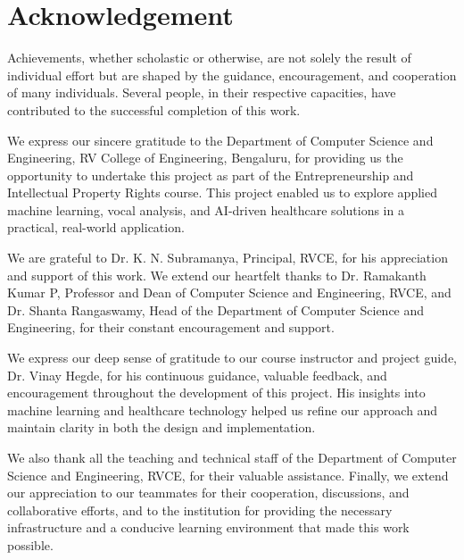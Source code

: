 
\newpage
\chapter*{Acknowledgement}

Achievements, whether scholastic or otherwise, are not solely the result of individual effort but are shaped by the guidance, encouragement, and cooperation of many individuals. Several people, in their respective capacities, have contributed to the successful completion of this work.

We express our sincere gratitude to the Department of Computer Science and Engineering, RV College of Engineering, Bengaluru, for providing us the opportunity to undertake this project as part of the Entrepreneurship and Intellectual Property Rights course. This project enabled us to explore applied machine learning, vocal analysis, and AI-driven healthcare solutions in a practical, real-world application.

We are grateful to Dr. K. N. Subramanya, Principal, RVCE, for his appreciation and support of this work. We extend our heartfelt thanks to Dr. Ramakanth Kumar P, Professor and Dean of Computer Science and Engineering, RVCE, and Dr. Shanta Rangaswamy, Head of the Department of Computer Science and Engineering, for their constant encouragement and support.

We express our deep sense of gratitude to our course instructor and project guide, Dr. Vinay Hegde, for his continuous guidance, valuable feedback, and encouragement throughout the development of this project. His insights into machine learning and healthcare technology helped us refine our approach and maintain clarity in both the design and implementation.

We also thank all the teaching and technical staff of the Department of Computer Science and Engineering, RVCE, for their valuable assistance. Finally, we extend our appreciation to our teammates for their cooperation, discussions, and collaborative efforts, and to the institution for providing the necessary infrastructure and a conducive learning environment that made this work possible.
